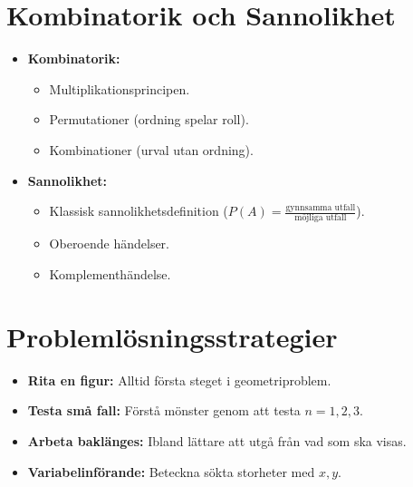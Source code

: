 \documentclass[11pt, a4paper]{article}
\begin{document}
\section{Kombinatorik och Sannolikhet}
\begin{itemize}
    \item \textbf{Kombinatorik:}
    \begin{itemize}
        \item Multiplikationsprincipen.
        \item Permutationer (ordning spelar roll).
        \item Kombinationer (urval utan ordning).
    \end{itemize}
    \item \textbf{Sannolikhet:}
    \begin{itemize}
        \item Klassisk sannolikhetsdefinition ($P(A) = \frac{\text{gynnsamma utfall}}{\text{möjliga utfall}}$).
        \item Oberoende händelser.
        \item Komplementhändelse.
    \end{itemize}
\end{itemize}

\section{Problemlösningsstrategier}
\begin{itemize}
    \item \textbf{Rita en figur:} Alltid första steget i geometriproblem.
    \item \textbf{Testa små fall:} Förstå mönster genom att testa $n=1, 2, 3$.
    \item \textbf{Arbeta baklänges:} Ibland lättare att utgå från vad som ska visas.
    \item \textbf{Variabelinförande:} Beteckna sökta storheter med $x, y$.
\end{itemize}
\end{document}
